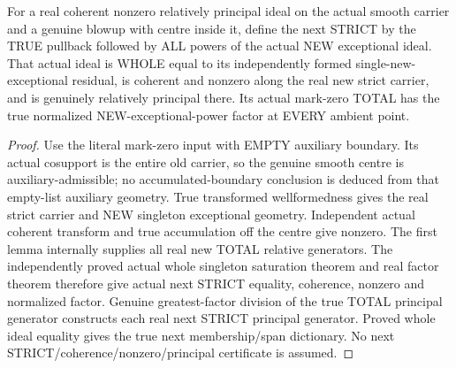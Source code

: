 \begin{theorem}
\label{hir:sharp-actual-chronological-next-strict-genuine-closure}
\leanok
For a real coherent nonzero relatively principal ideal on the actual smooth
carrier and a genuine blowup with centre inside it, define the next STRICT
by the TRUE pullback followed by ALL powers of the actual NEW exceptional
ideal. That actual ideal is WHOLE equal to its independently formed
single-new-exceptional residual, is coherent and nonzero along the real new
strict carrier, and is genuinely relatively principal there. Its actual
mark-zero TOTAL has the true normalized NEW-exceptional-power factor at
EVERY ambient point.
\end{theorem}
\begin{proof}
Use the literal mark-zero input with EMPTY auxiliary boundary. Its actual
cosupport is the entire old carrier, so the genuine smooth centre is
auxiliary-admissible; no accumulated-boundary conclusion is deduced from
that empty-list auxiliary geometry. True transformed wellformedness gives
the real strict carrier and NEW singleton exceptional geometry. Independent
actual coherent transform and true accumulation off the centre give nonzero.
The first lemma internally supplies all real new TOTAL relative generators.
The independently proved actual whole singleton saturation theorem and real
factor theorem therefore give actual next STRICT equality, coherence,
nonzero and normalized factor. Genuine greatest-factor division of the true
TOTAL principal generator constructs each real next STRICT principal
generator. Proved whole ideal equality gives the true next membership/span
dictionary. No next STRICT/coherence/nonzero/principal certificate is assumed.
\end{proof}


